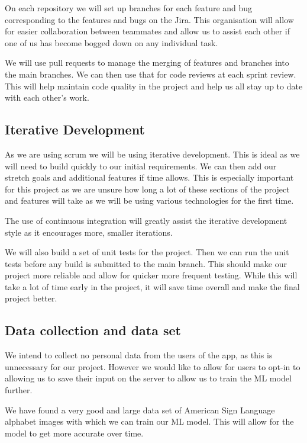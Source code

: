 \documentclass[10pt]{article}
\begin{document}
On each repository we will set up branches for each feature and bug corresponding to the features and bugs on the Jira. This organisation will allow for easier collaboration between teammates and allow us to assist each other if one of us has become bogged down on any individual task.

We will use pull requests to manage the merging of features and branches into the main branches. We can then use that for code reviews at each sprint review. This will help maintain code quality in the project and help us all stay up to date with each other's work.


\subsection{Iterative Development}

As we are using scrum we will be using iterative development. This is ideal as we will need to build quickly to our initial requirements. We can then add our stretch goals and additional features if time allows. This is especially important for this project as we are unsure how long a lot of these sections of the project and features will take as we will be using various technologies for the first time. 

The use of continuous integration will greatly assist the iterative development style as it encourages more, smaller iterations.

We will also build a set of unit tests for the project. Then we can run the unit tests before any build is submitted to the main branch. This should make our project more reliable and allow for quicker more frequent testing. While this will take a lot of time early in the project, it will save time overall and make the final project better.


\subsection{Data collection and data set}

We intend to collect no personal data from the users of the app, as this is unnecessary for our project. However we would like to allow for users to opt-in to allowing us to save their input on the server to allow us to train the ML model further. 

We have found a very good and large data set of American Sign Language alphabet images with which we can train our ML model. This will allow for the model to get more accurate over time.
\end{document}
